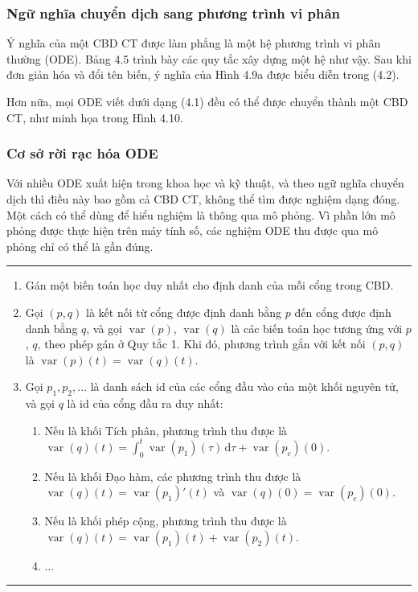 \subsubsection{Ngữ nghĩa chuyển dịch sang phương trình vi phân}
Ý nghĩa của một CBD CT được làm phẳng là một hệ phương trình vi phân thường (ODE). Bảng 4.5 trình bày các quy tắc xây dựng một hệ như vậy. Sau khi đơn giản hóa và đổi tên biến, ý nghĩa của Hình 4.9a được biểu diễn trong (4.2).

Hơn nữa, mọi ODE viết dưới dạng (4.1) đều có thể được chuyển thành một CBD CT, như minh họa trong Hình 4.10.

\subsubsection{Cơ sở rời rạc hóa ODE}
Với nhiều ODE xuất hiện trong khoa học và kỹ thuật, và theo ngữ nghĩa chuyển dịch thì điều này bao gồm cả CBD CT, không thể tìm được nghiệm dạng đóng. Một cách có thể dùng để hiểu nghiệm là thông qua mô phỏng. Vì phần lớn mô phỏng được thực hiện trên máy tính số, các nghiệm ODE thu được qua mô phỏng chỉ có thể là gần đúng.
\begin{table}[htbp]
\caption{Ngữ nghĩa chuyển dịch của một CBD CT được làm phẳng}
\begin{minipage}{\linewidth}\small\hrule\medskip
\begin{enumerate}
\item Gán một biến toán học duy nhất cho định danh của mỗi cổng trong CBD.
\item Gọi $(p,q)$ là kết nối từ cổng được định danh bằng $p$ đến cổng được định danh bằng $q$, và gọi $\operatorname{var}(p)$, $\operatorname{var}(q)$ là các biến toán học tương ứng với $p$, $q$, theo phép gán ở Quy tắc 1. Khi đó, phương trình gắn với kết nối $(p,q)$ là $\operatorname{var}(p)(t)=\operatorname{var}(q)(t)$.
\item Gọi $p_1,p_2,\ldots$ là danh sách id của các cổng đầu vào của một khối nguyên tử, và gọi $q$ là id của cổng đầu ra duy nhất:
\begin{enumerate}\renewcommand{\labelenumii}{\alph{enumii}.}
\item Nếu là khối Tích phân, phương trình thu được là $\operatorname{var}(q)(t)=\int_0^t\operatorname{var}(p_1)(\tau)\,\mathrm{d}\tau+\operatorname{var}(p_c)(0)$.
\item Nếu là khối Đạo hàm, các phương trình thu được là $\operatorname{var}(q)(t)=\operatorname{var}(p_1)'(t)$ và $\operatorname{var}(q)(0)=\operatorname{var}(p_c)(0)$.
\item Nếu là khối phép cộng, phương trình thu được là $\operatorname{var}(q)(t)=\operatorname{var}(p_1)(t)+\operatorname{var}(p_2)(t)$.
\item $\ldots$
\end{enumerate}
\end{enumerate}\medskip\hrule\end{minipage}
\end{table}

